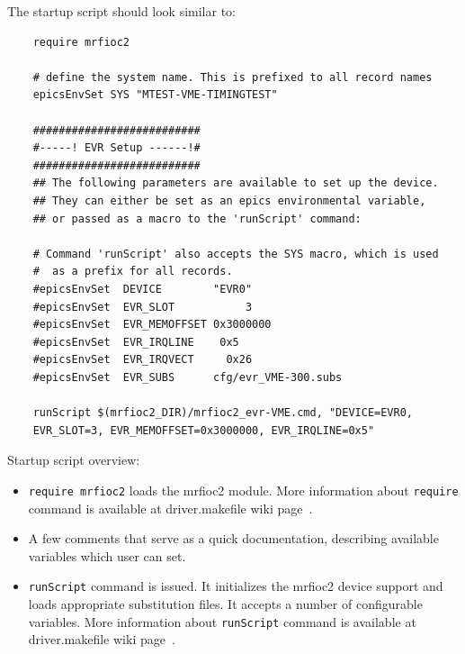 \documentclass[12pt,a4paper]{article}
\begin{document}
\begin{enumerate}
	The startup script should look similar to:
\begin{verbatim}
	require mrfioc2
	
	# define the system name. This is prefixed to all record names
	epicsEnvSet SYS "MTEST-VME-TIMINGTEST"
	
	##########################
	#-----! EVR Setup ------!#
	##########################
	## The following parameters are available to set up the device. 
	## They can either be set as an epics environmental variable, 
	## or passed as a macro to the 'runScript' command:
	
	# Command 'runScript' also accepts the SYS macro, which is used 
	#  as a prefix for all records.
	#epicsEnvSet  DEVICE        "EVR0"		
	#epicsEnvSet  EVR_SLOT		     3			
	#epicsEnvSet  EVR_MEMOFFSET	0x3000000
	#epicsEnvSet  EVR_IRQLINE 	 0x5		
	#epicsEnvSet  EVR_IRQVECT	  0x26
	#epicsEnvSet  EVR_SUBS      cfg/evr_VME-300.subs
	
	runScript $(mrfioc2_DIR)/mrfioc2_evr-VME.cmd, "DEVICE=EVR0, 
	EVR_SLOT=3, EVR_MEMOFFSET=0x3000000, EVR_IRQLINE=0x5"
\end{verbatim}
Startup script overview:
\begin{itemize}
\item 
	\texttt{require mrfioc2} loads the mrfioc2 module. More information about \texttt{require} command is available at driver.makefile wiki page~\cite{driver.makefile}.
\item 
	A few comments that serve as a quick documentation, describing available variables which user can set.
\item 
	\texttt{runScript} command is issued. It initializes the mrfioc2 device support and loads appropriate substitution files. It accepts a number of configurable variables. More information about \texttt{runScript} command is available at driver.makefile wiki page~\cite{driver.makefile}.
\end{itemize}


\end{enumerate}
\end{document}
